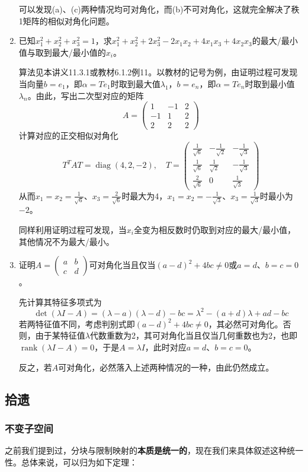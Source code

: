 \documentclass[a4paper,UTF8,fontset=windows]{ctexart}
\DeclareMathOperator{\diag}{diag}
\DeclareMathOperator{\rank}{rank}
\newcommand*{\note}{\noindent *}
\begin{document}
\begin{enumerate}
    \note 可以发现(a)、(c)两种情况均可对角化，而(b)不可对角化，这就完全解决了秩1矩阵的相似对角化问题。

    \item 已知$x_1^2+x_2^2+x_3^2=1$，求$x_1^2+x_2^2+2x_3^2-2x_1x_2+4x_1x_3+4x_2x_3$的最大/最小值与取到最大/最小值的$x_i$。
    
    算法见本讲义11.3.1或教材6.1.2例11。以教材的记号为例，由证明过程可发现当向量$b=e_1$，即$\alpha=Te_1$时取到最大值$\lambda_1$，$b=e_n$，即$\alpha=Te_n$时取到最小值$\lambda_n$。由此，写出二次型对应的矩阵
    $$A=\begin{pmatrix}1&-1&2\\-1&1&2\\2&2&2\end{pmatrix}$$
    计算对应的正交相似对角化
    $$T^TAT=\diag(4,2,-2),\quad T=\begin{pmatrix}\frac{1}{\sqrt6}&-\frac{1}{\sqrt2}&-\frac{1}{\sqrt3}\\\frac{1}{\sqrt6}&\frac{1}{\sqrt2}&-\frac{1}{\sqrt3}\\\frac{2}{\sqrt6}&0&\frac{1}{\sqrt3}\end{pmatrix}$$
    从而$x_1=x_2=\frac{1}{\sqrt6}$、$x_3=\frac{2}{\sqrt6}$时最大为4，$x_1=x_2=-\frac{1}{\sqrt3}$、$x_3=\frac{1}{\sqrt3}$时最小为$-2$。

    \note 同样利用证明过程可发现，当$x_i$全变为相反数时仍取到对应的最大/最小值，其他情况不为最大/最小。

    \item 证明$A=\begin{pmatrix}a&b\\c&d\end{pmatrix}$可对角化当且仅当$(a-d)^2+4bc\ne0$或$a=d$、$b=c=0$。
    
    先计算其特征多项式为
    $$\det(\lambda I-A)=(\lambda-a)(\lambda-d)-bc=\lambda^2-(a+d)\lambda+ad-bc$$
    若两特征值不同，考虑判别式即$(a-d)^2+4bc\ne0$，其必然可对角化。否则，由于某特征值$\lambda$代数重数为2，其可对角化当且仅当几何重数也为2，也即$\rank(\lambda I-A)=0$，于是$A=\lambda I$，此时对应$a=d$、$b=c=0$。

    反之，若$A$可对角化，必然落入上述两种情况的一种，由此仍然成立。
\end{enumerate}

\subsection{拾遗}
\subsubsection{不变子空间}
之前我们提到过，分块与限制映射的\textbf{本质是统一的}，现在我们来具体叙述这种统一性。总体来说，可以归为如下定理：
\end{document}
